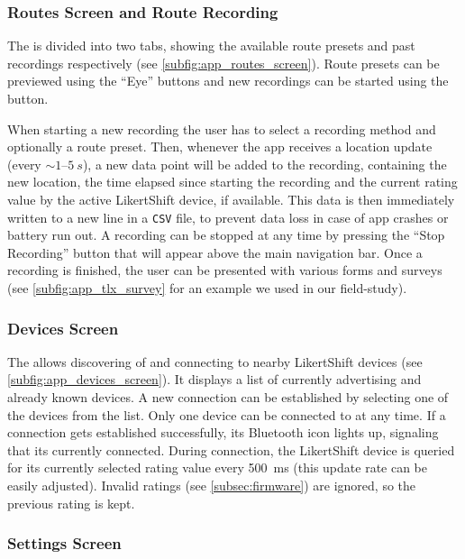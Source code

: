 \subsubsection*{Routes Screen and Route Recording}

The \routesscreen is divided into two tabs, showing the available route presets and past recordings respectively (see \autoref{subfig:app_routes_screen}).
Route presets can be previewed using the “Eye” buttons and new recordings can be started using the \raisebox{0.1em}{\textbf{+}} button.

When starting a new recording the user has to select a recording method and optionally a route preset.
Then, whenever the app receives a location update (every $\sim1$--$\SI{5}{s}$), a new data point will be added to the recording, containing the new location, the time elapsed since starting the recording and the current rating value by the active LikertShift device, if available.
This data is then immediately written to a new line in a \texttt{CSV} file, to prevent data loss in case of app crashes or battery run out.
A recording can be stopped at any time by pressing the “Stop Recording” button that will appear above the main navigation bar.
Once a recording is finished, the user can be presented with various forms and surveys (see \autoref{subfig:app_tlx_survey} for an example we used in our field-study).

\subsubsection*{Devices Screen}

The \devicesscreen allows discovering of and connecting to nearby LikertShift devices (see \autoref{subfig:app_devices_screen}).
It displays a list of currently advertising and already known devices.
A new connection can be established by selecting one of the devices from the list.
Only one device can be connected to at any time.
If a connection gets established successfully, its Bluetooth icon lights up, signaling that its currently connected.
During connection, the LikertShift device is queried for its currently selected rating value every \SI{500}{ms} (this update rate can be easily adjusted).
Invalid ratings (see \autoref{subsec:firmware}) are ignored, so the previous rating is kept.

\subsubsection*{Settings Screen}


